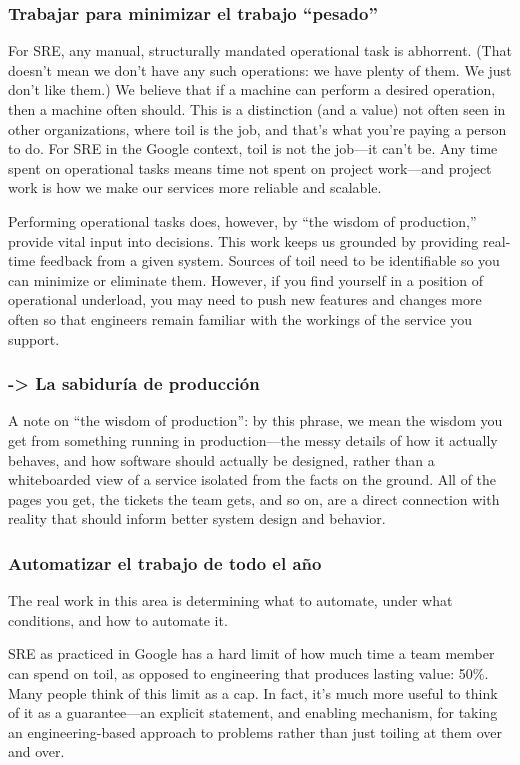 \subsubsection{Trabajar para minimizar el trabajo ``pesado''}

For SRE, any manual, structurally mandated operational task is
abhorrent. (That doesn’t mean we don’t have any such operations: we
have plenty of them. We just don’t like them.) We believe that if a
machine can perform a desired operation, then a machine often
should. This is a distinction (and a value) not often seen in other
organizations, where toil is the job, and that’s what you’re paying a
person to do. For SRE in the Google context, toil is not the job—it
can’t be. Any time spent on operational tasks means time not spent on
project work—and project work is how we make our services more
reliable and scalable.

Performing operational tasks does, however, by ``the wisdom of
production,'' provide vital input into decisions. This work keeps us
grounded by providing real-time feedback from a given system. Sources
of toil need to be identifiable so you can minimize or eliminate
them. However, if you find yourself in a position of operational
underload, you may need to push new features and changes more often so
that engineers remain familiar with the workings of the service you
support.

\subsubsection{-> La sabiduría de producción}

A note on ``the wisdom of production'': by this phrase, we mean the
wisdom you get from something running in production—the messy details
of how it actually behaves, and how software should actually be
designed, rather than a whiteboarded view of a service isolated from
the facts on the ground. All of the pages you get, the tickets the
team gets, and so on, are a direct connection with reality that should
inform better system design and behavior.

\subsubsection{Automatizar el trabajo de todo el año}

The real work in this area is determining what to automate, under what
conditions, and how to automate it.

SRE as practiced in Google has a hard limit of how much time a team
member can spend on toil, as opposed to engineering that produces
lasting value: 50\%. Many people think of this limit as a cap. In
fact, it’s much more useful to think of it as a guarantee—an explicit
statement, and enabling mechanism, for taking an engineering-based
approach to problems rather than just toiling at them over and over.

